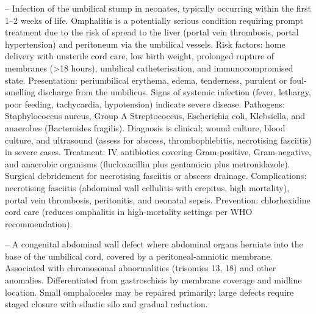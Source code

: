 -- Infection of the umbilical stump in neonates, typically occurring within the first 1--2 weeks of life. Omphalitis is a potentially serious condition requiring prompt treatment due to the risk of spread to the liver (portal vein thrombosis, portal hypertension) and peritoneum via the umbilical vessels. Risk factors: home delivery with unsterile cord care, low birth weight, prolonged rupture of membranes (>18 hours), umbilical catheterisation, and immunocompromised state. Presentation: periumbilical erythema, edema, tenderness, purulent or foul-smelling discharge from the umbilicus. Signs of systemic infection (fever, lethargy, poor feeding, tachycardia, hypotension) indicate severe disease. Pathogens: Staphylococcus aureus, Group A Streptococcus, Escherichia coli, Klebsiella, and anaerobes (Bacteroides fragilis). Diagnosis is clinical; wound culture, blood culture, and ultrasound (assess for abscess, thrombophlebitis, necrotising fasciitis) in severe cases. Treatment: IV antibiotics covering Gram-positive, Gram-negative, and anaerobic organisms (flucloxacillin plus gentamicin plus metronidazole). Surgical debridement for necrotising fasciitis or abscess drainage. Complications: necrotising fasciitis (abdominal wall cellulitis with crepitus, high mortality), portal vein thrombosis, peritonitis, and neonatal sepsis. Prevention: chlorhexidine cord care (reduces omphalitis in high-mortality settings per WHO recommendation).

-- A congenital abdominal wall defect where abdominal organs herniate into the base of the umbilical cord, covered by a peritoneal-amniotic membrane. Associated with chromosomal abnormalities (trisomies 13, 18) and other anomalies. Differentiated from gastroschisis by membrane coverage and midline location. Small omphaloceles may be repaired primarily; large defects require staged closure with silastic silo and gradual reduction.

